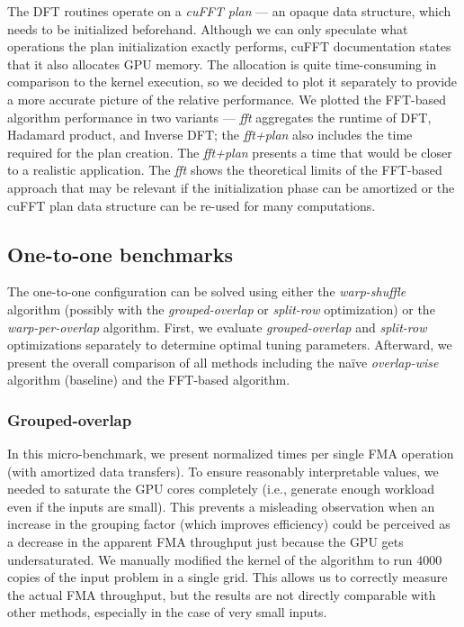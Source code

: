 The DFT routines operate on a \emph{cuFFT plan} --- an opaque data structure, which needs to be initialized beforehand. Although we can only speculate what operations the plan initialization exactly performs, cuFFT documentation states that it also allocates GPU memory. The allocation is quite time-consuming in comparison to the kernel execution, so we decided to plot it separately to provide a more accurate picture of the relative performance. We plotted the FFT-based algorithm performance in two variants --- \emph{fft} aggregates the runtime of DFT, Hadamard product, and Inverse DFT; the \emph{fft+plan} also includes the time required for the plan creation. The \emph{fft+plan} presents a time that would be closer to a realistic application. The \emph{fft} shows the theoretical limits of the FFT-based approach that may be relevant if the initialization phase can be amortized or the cuFFT plan data structure can be re-used for many computations.

\subsection{One-to-one benchmarks}

The one-to-one configuration can be solved using either the \emph{warp-shuffle} algorithm (possibly with the \emph{grouped-overlap} or \emph{split-row} optimization) or the \emph{warp-per-overlap} algorithm. First, we evaluate \emph{grouped-overlap} and \emph{split-row} optimizations separately to determine optimal tuning parameters. Afterward, we present the overall comparison of all methods including the na\"{i}ve \emph{overlap-wise} algorithm (baseline) and the FFT-based algorithm.

\subsubsection{Grouped-overlap}

In this micro-benchmark, we present normalized times per single FMA operation (with amortized data transfers). To ensure reasonably interpretable values, we needed to saturate the GPU cores completely (i.e., generate enough workload even if the inputs are small). This prevents a misleading observation when an increase in the grouping factor (which improves efficiency) could be perceived as a decrease in the apparent FMA throughput just because the GPU gets undersaturated. We manually modified the kernel of the algorithm to run $4000$ copies of the input problem in a single grid. This allows us to correctly measure the actual FMA throughput, but the results are not directly comparable with other methods, especially in the case of very small inputs.

